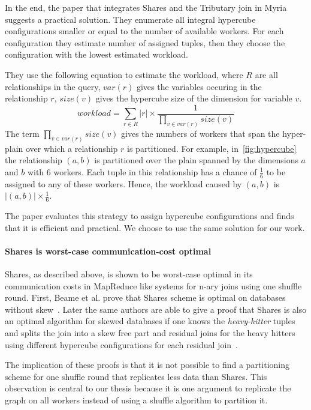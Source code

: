 In the end, the paper that integrates Shares and the Tributary join in Myria suggests a practical solution.
They enumerate all integral hypercube configurations smaller or equal to the number of available workers.
For each configuration they estimate number of assigned tuples, then they choose the configuration with the lowest estimated workload.

They use the following equation to estimate the workload, where $R$ are all relationships in the query, $var(r)$ gives the variables
occuring in the relationship $r$, $size(v)$ gives the hypercube size of the dimension for variable $v$.
\begin{equation} \label{eqn:estimated-workload}
    workload = \sum_{r \in R}{|r| \times \frac{1}{\prod_{v \in var(r)}{size(v)}}}
\end{equation}
The term $\prod_{v \in var(r)}{size(v)}$ gives the numbers of workers that span the hyper-plain over which a relationship $r$ is
partitioned.
For example, in~\cref{fig:hypercube} the relationship $(a, b)$ is partitioned over the plain spanned by the dimensions $a$ and $b$ with
6 workers.
Each tuple in this relationship has a chance of $\frac{1}{6}$ to be assigned to any of these workers.
Hence, the workload caused by $(a, b)$ is $|(a, b)| \times \frac{1}{6}$.

The paper evaluates this strategy to assign hypercube configurations and finds that it is efficient and practical.
We choose to use the same solution for our work.

\paragraph{Shares is worst-case communication-cost optimal}
Shares, as described above, is shown to be worst-case optimal in its communication costs in MapReduce like systems for
n-ary joins using one shuffle round.
First, Beame et al. prove that Shares scheme is optimal on databases without skew~\cite{shares-proof}. %
Later the same authors are able to give a proof that Shares is also an optimal algorithm for skewed databases if one knows the
\textit{heavy-hitter} tuples and splits the join into a skew free part and residual joins for the heavy hitters using different
hypercube configurations for each residual join~\cite{shares-skew-proof}. %

The implication of these proofs is that it is not possible to find a partitioning scheme for one shuffle round that replicates
less data than Shares.
This observation is central to our thesis because it is one argument to replicate the graph on all workers instead of using
a shuffle algorithm to partition it.

